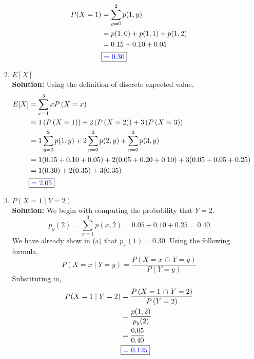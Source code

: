 \documentclass[12pt]{article}
\newcommand{\pars}[1]{\left( {#1} \right) }
\newcommand{\prob}[1]{P \left( {#1} \right) }
\begin{document}
\begin{enumerate}
\begin{enumerate}
        \begin{align}
            P(X=1) &= \sum_{y=0}^2 p(1,y) \notag\\
            &= p(1,0) + p(1,1) + p(1,2)\notag\\
            &= 0.15 + 0.10 + 0.05 \notag\\
            & \fbox{\color{blue}= 0.30} \notag
        \end{align}
                \vspace{0.15in}
        \item $E[X]$
        \vspace{0.15in}\\
        \textbf{Solution:} Using the definition of discrete expected value,
        \begin{align}
            E[X] &= \sum_{x=1}^3 x \prob{X=x} \notag\\
            &= 1\pars{  \prob{X=1}} + 2\pars{\prob{X=2}} + 3\pars{\prob{X=3}} \notag \\
            &= 1 \sum_{y=0}^2 p(1,y) + 2 \sum_{y=0}^2 p(2,y) + \sum_{y=0}^2 p(3,y) \notag\\
            &= 1 (0.15 + 0.10 + 0.05) + 2 (0.05 + 0.20 + 0.10) + 3 (0.05 + 0.05 + 0.25) \notag\\
            &= 1(0.30) + 2(0.35) + 3(0.35) \notag\\
            & \fbox{\color{blue} = 2.05}\notag
        \end{align}
        \vspace{0.15in}
        \item $P(X=1 \mid Y=2)$
        \vspace{0.15in}\\
        \textbf{Solution:} We begin with computing the probability that $Y = 2$.
        $$p_y(2) = \sum_{x=1}^3 p(x,2) = 0.05 + 0.10 + 0.25 = 0.40$$
        We have already show in (a) that $p_x(1) = 0.30$. Using the following formula,
        $$\prob{X = x \mid Y = y} = \frac{\prob{X = x \,\cap\, Y = y}}{\prob{Y=y}}$$
        Substituting in, 
        \begin{align}
            P(X=1 \mid Y=2) &= \frac{\prob{X=1 \,\cap\, Y=2}}{\prob{Y=2}}\notag\\
            &= \frac{p(1,2)}{p_y(2)}\notag\\
            &= \frac{0.05}{0.40} \notag\\
            & \fbox{\color{blue} = 0.125} \notag
        \end{align}
                \vspace{0.15in}

\end{enumerate}
\end{enumerate}
\end{document}
